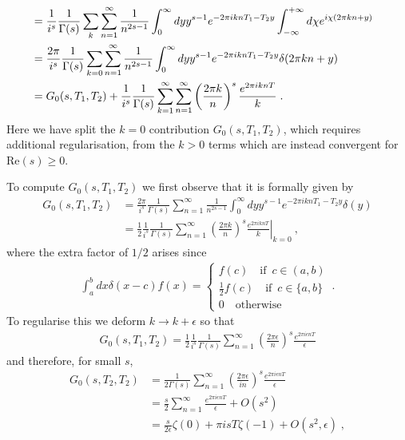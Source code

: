\documentclass[11pt]{article}
\numberwithin{equation}{section}
\begin{document}
\begin{appendix}
\begin{align}
&=\frac{1}{i^s}\frac{1}{\Gamma(s)} \sum_k \sum_{n = 1}^{\infty} \frac{1}{n^{2s-1}}\int_{0}^{\infty} dy  y^{s-1} e^{-2\pi i k n T_1-T_2y}\int_{-\infty}^{+\infty}d\chi e^{i\chi(2\pi kn+y) } \cr
&=\frac{2\pi}{i^s}\frac{1}{\Gamma(s)} \sum_{k=0} \sum_{n = 1}^{\infty} \frac{1}{n^{2s-1}}\int_{0}^{\infty} dy  y^{s-1} e^{-2\pi i k n T_1-T_2y}\delta(2\pi kn+y)  \cr
&=G_0(s,T_1,T_2)+
\frac{1}{i^s}\frac{1}{\Gamma(s)} \sum_{k=1}^{\infty}\sum_{n = 1}^{\infty} \left(\frac{2\pi k}{n}\right)^s \frac{e^{2\pi i k n T}}{k}  \; .
\label{CompactSeries}
\end{align}
Here we have split the $k=0$ contribution $G_0(s,T_1,T_2)$, which requires additional regularisation, from the $k>0$ terms which are instead convergent for $\text{Re}(s)\ge0$.  

To compute $G_0(s,T_1,T_2)$ we first observe that it is formally given by 
\begin{align}
  G_0(s,T_1,T_2) &=    \frac{2\pi}{i^s}\frac{1}{\Gamma(s)}   \sum_{n = 1}^{\infty} \frac{1}{n^{2s-1}}\int_{0}^{\infty} d y  y^{s-1} e^{-2\pi i k n T_1-T_2y}\delta(y)\nonumber\\
  & = \frac12 \frac{1}{i^s}\frac{1}{\Gamma(s)}  \sum_{n = 1}^{\infty}\left. \left(\frac{2\pi k}{n}\right)^s\frac{e^{2\pi i k n T}}{k}  \right|_{k=0}\ ,
\end{align}
where the extra factor of $1/2$ arises since
\begin{align}
\int_a^b d x\delta(x-c)f(x)=
\begin{cases}
f(c)\quad  \text{if}\,\,\,c\in (a,b)\\
\frac12 f(c)\quad  \text{if}\,\,\,c\in\{a,b\}\\
0 \quad \text{otherwise}
\end{cases}\,.
\end{align}
To regularise this  we
deform $k\to k+ \epsilon$   so that
\begin{align}
G_0(s,T_1,T_2) = \frac{1}{2}\frac{1}{i^s}\frac{1}{\Gamma(s)} \sum_{n = 1}^{\infty} \left(\frac{2\pi \epsilon}{n}\right)^s \frac{e^{2\pi i \epsilon n T}}{\epsilon}	
\end{align}
and therefore, for small $s$, 
\begin{align}
G_0(s,T_2,T_2)&=\frac{1}{2\Gamma(s)}\sum_{n = 1}^{\infty} \left(\frac{2\pi \epsilon}{in}\right)^s \frac{e^{2\pi i \epsilon n T}}{\epsilon} \nonumber\\
&= \frac{s}{2}\sum_{n = 1}^{\infty}\frac{e^{2\pi i \epsilon n T}}{\epsilon}+O(s^2)\nonumber\\
& =\frac{s}{2\epsilon}\zeta(0)+\pi i s T \zeta (-1)+O(s^2,\epsilon)\;,

\end{align}
\end{appendix}
\end{document}

